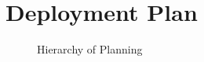 
\section{Deployment Plan}


\begin{figure}[ht]
\centering
\caption{Hierarchy of Planning}
\label{img:hier}
\end{figure}





